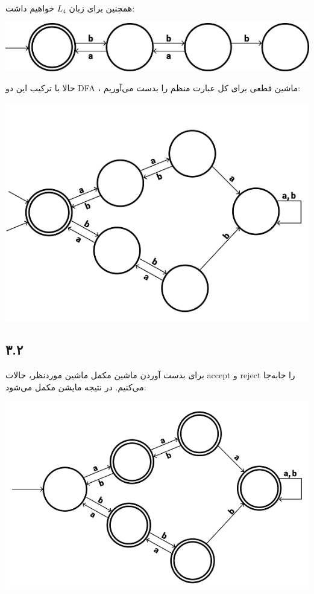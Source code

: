 همچنین برای زبان
$L_4$
خواهیم داشت:

\begin{center}
	\includegraphics{DFA16}
\end{center}

حالا با ترکیب این دو DFA ، ماشین قطعی برای کل عبارت منظم را بدست می‌آوریم:

\begin{center}
	\includegraphics{DFA17}
\end{center}

\subsection*{۳.۲}

برای بدست آوردن ماشین مکمل ماشین موردنظر، حالات accept و reject را جابه‌جا می‌کنیم. در نتیجه مایشن مکمل می‌شود:

\begin{center}
	\includegraphics{DFA18}
\end{center}

